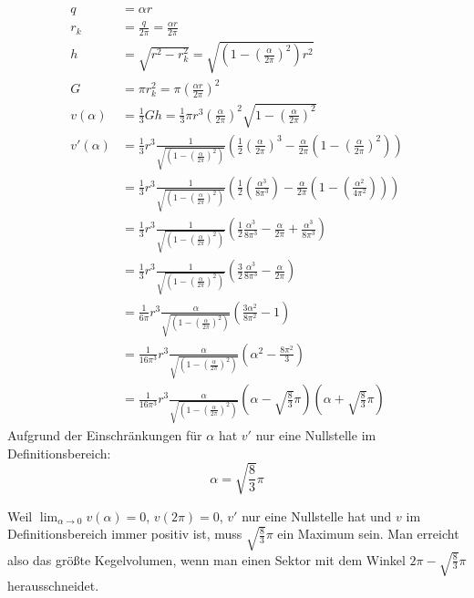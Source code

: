 \documentclass[a4paper,10pt]{article}
\begin{document}
\begin{align}
 q & = \alpha r\\
 r_k & = \frac{q}{2 \pi} = \frac{\alpha r}{2 \pi}\\
 h & = \sqrt{r^2 - r_k^2} = \sqrt{\left( 1 - \left( \frac{\alpha}{2 \pi} \right)^2 \right) r^2}\\
 G & = \pi r_k^2 = \pi \left( \frac{\alpha r}{2 \pi} \right)^2\\
 v(\alpha) & = \frac{1}{3} G h = \frac{1}{3} \pi r^3 \left( \frac{\alpha}{2 \pi} \right)^2 \sqrt{1 - \left( \frac{\alpha}{2 \pi} \right)^2}\\
 v'(\alpha) & = \frac{1}{3} r^3 \frac{1}{\sqrt{\left( 1 - \left( \frac{\alpha}{2 \pi} \right)^2 \right)}} \left( \frac{1}{2} \left( \frac{\alpha}{2 \pi} \right)^3 - \frac{\alpha}{2 \pi} \left( 1 - \left( \frac{\alpha}{2 \pi} \right)^2 \right) \right)\\
 & = \frac{1}{3} r^3 \frac{1}{\sqrt{\left( 1 - \left( \frac{\alpha}{2 \pi} \right)^2 \right)}} \left( \frac{1}{2} \left( \frac{\alpha^3}{8 \pi^3} \right) - \frac{\alpha}{2 \pi} \left( 1 - \left( \frac{\alpha^2}{4 \pi^2} \right) \right) \right)\\
 & = \frac{1}{3} r^3 \frac{1}{\sqrt{\left( 1 - \left( \frac{\alpha}{2 \pi} \right)^2 \right)}} \left( \frac{1}{2} \frac{\alpha^3}{8 \pi^3} - \frac{\alpha}{2 \pi} + \frac{\alpha^3}{8 \pi^3} \right)\\
 & = \frac{1}{3} r^3 \frac{1}{\sqrt{\left( 1 - \left( \frac{\alpha}{2 \pi} \right)^2 \right)}} \left( \frac{3}{2} \frac{\alpha^3}{8 \pi^3} - \frac{\alpha}{2 \pi} \right)\\
 & = \frac{1}{6 \pi} r^3 \frac{\alpha}{\sqrt{\left( 1 - \left( \frac{\alpha}{2 \pi} \right)^2 \right)}} \left( \frac{3 \alpha^2}{8 \pi^2} - 1 \right)\\
 & = \frac{1}{16 \pi^3} r^3 \frac{\alpha}{\sqrt{\left( 1 - \left( \frac{\alpha}{2 \pi} \right)^2 \right)}} \left( \alpha^2 - \frac{8 \pi^2}{3} \right)\\
 & = \frac{1}{16 \pi^3} r^3 \frac{\alpha}{\sqrt{\left( 1 - \left( \frac{\alpha}{2 \pi} \right)^2 \right)}} \left( \alpha - \sqrt{\frac{8}{3}}\pi \right) \left( \alpha + \sqrt{\frac{8}{3}}\pi \right)
\end{align}
Aufgrund der Einschränkungen für $\alpha$ hat $v'$ nur eine Nullstelle im Definitionsbereich:
\begin{equation}
 \alpha = \sqrt{\frac{8}{3}}\pi
\end{equation}

Weil $\lim_{\alpha \rightarrow 0} v(\alpha) = 0$, $v(2 \pi) = 0$, $v'$ nur eine Nullstelle hat und $v$ im Definitionsbereich immer positiv ist, muss $\sqrt{\frac{8}{3}}\pi$ ein Maximum sein.
Man erreicht also das größte Kegelvolumen, wenn man einen Sektor mit dem Winkel $2 \pi - \sqrt{\frac{8}{3}}\pi$ herausschneidet.
\end{document}
